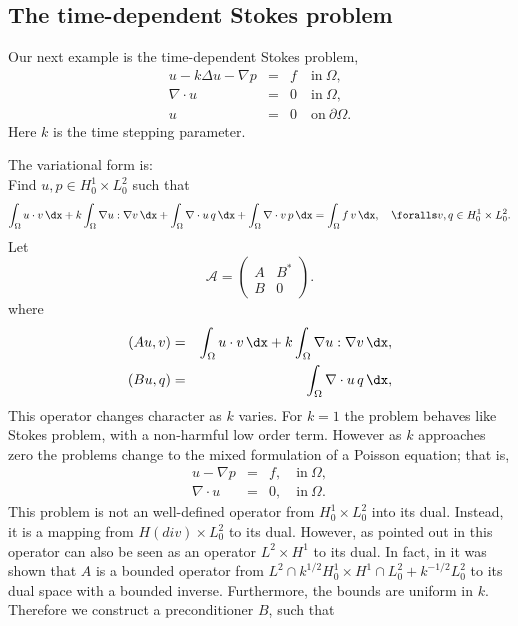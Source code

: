 \subsection{The time-dependent Stokes problem}
Our next example is the time-dependent Stokes problem,
\begin{eqnarray}
u - k \Delta u - \nabla p &=& f \quad \mbox{in} \ \Omega, \\
\nabla \cdot u &=& 0 \quad \mbox{in} \  \Omega, \\
             u &=& 0   \quad \mbox{on} \  \partial \Omega.
\end{eqnarray}
Here $k$ is the time stepping parameter.

The variational form is: \\
Find $u,p \in H^1_0 \times L_0^2$ such that
\[
\int_\Omega u \cdot v \,  \dx +
k \int_\Omega \nabla u : \nabla v \,  \dx +
\int_\Omega \nabla \cdot u \, q \,  \dx +
\int_\Omega \nabla \cdot v \, p \,  \dx = \int_\Omega f\, v\, \dx   , \quad
\foralls v,q \in H^1_0 \times L_0^2.
\]
Let
\[
\mathcal{A}  =
\begin{pmatrix} A & B^* \\ B & 0 \end{pmatrix}.
\]
where
\begin{eqnarray}
(A u, v) &=& \int_\Omega u \cdot v \,  \dx +  k \int_\Omega \nabla u :
\nabla v \,  \dx, \\
(B u, q) &=& \int_\Omega \nabla \cdot u \, q \,  \dx,
\end{eqnarray}
This operator changes character as $k$ varies.  For $k=1$ the problem
behaves like Stokes problem, with a non-harmful low order
term. However as $k$ approaches zero the problems change to the mixed
formulation of a Poisson equation; that is,
\begin{eqnarray}
u - \nabla p &=& f, \quad \mbox{in} \ \Omega, \\
\nabla \cdot u  &=& 0, \quad \mbox{in} \ \Omega.
\end{eqnarray}
This problem is not an well-defined operator from $H^1_0 \times L_0^2$
into its dual. Instead, it is a mapping from $H(div) \times L_0^2$ to
its dual.  However, as pointed out in \citet{MardalWinther2004} this
operator can also be seen as an operator $L^2 \times H^1$ to its dual.
In fact, in \citet{MardalTaiWinther2002,MardalWinther2004} it was
shown that $A$ is a bounded operator from $L^2 \cap k^{1/2}
H^1_0 \times H^1 \cap L_0^2 + k^{-1/2} L_0^2$ to its dual space with a
bounded inverse. Furthermore, the bounds are uniform in $k$.
Therefore we construct a preconditioner $B$, such that
